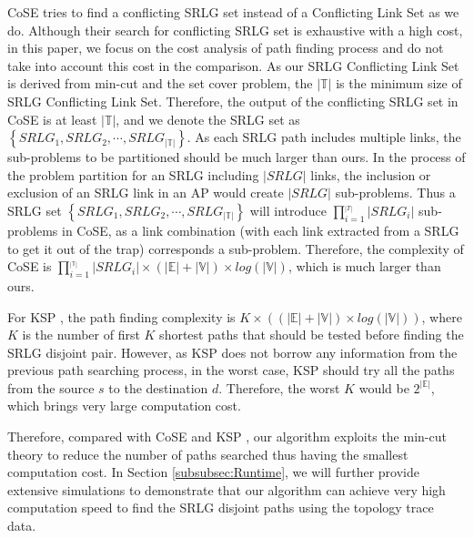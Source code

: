 CoSE tries to find a conflicting SRLG set instead of a Conflicting Link Set as we do. Although their search for conflicting SRLG set is exhaustive with a high cost, in this paper, we focus on the cost analysis of path finding process and do not take into account this cost in the comparison. As our SRLG Conflicting Link Set is derived from min-cut and the set cover problem, the $|\mathbb{T}|$ is the minimum size of SRLG Conflicting Link Set. Therefore, the output of the conflicting SRLG set in CoSE is at least $|\mathbb{T}|$, and we denote the SRLG set as $\left\{ {SRL{G_1},SRL{G_2}, \cdots ,SRL{G_{|\mathbb{T}|}}} \right\}$. As each SRLG path includes multiple links, the sub-problems to be partitioned should be much larger than ours. In the process of the problem partition for an SRLG including  $|SRLG|$ links, the inclusion or exclusion of an SRLG link in an AP would create  $|SRLG|$ sub-problems.  Thus a SRLG set $\left\{ {SRL{G_1},SRL{G_2}, \cdots ,SRL{G_{|\mathbb{T}|}}} \right\}$ will introduce $\prod\limits_{i = 1}^{_{\left| T \right|}} {\left| {SRL{G_i}} \right|}$ sub-problems in CoSE, as a link  combination (with each link extracted from a SRLG to get it out of the trap) corresponds  a sub-problem. Therefore, the complexity of CoSE  is $\prod\limits_{i = 1}^{_{|\mathbb{T}|}} {\left| {SRL{G_i}} \right|}\times (|\mathbb{E}|+|\mathbb{V}|)\times log(|\mathbb{V}|)$, which is much larger than ours.

For KSP \cite{eppstein1998finding}, the path finding complexity is $K\times ((|\mathbb{E}|+|\mathbb{V}|)\times log(|\mathbb{V}|))$, where $K$ is the number of first $K$ shortest paths that should be tested before finding the SRLG disjoint pair. However, as KSP does not borrow any information from the previous path searching process, in the worst case, KSP should try all the paths from the source $s$ to the destination $d$. Therefore, the worst $K$ would be  $2^{|\mathbb{E}|}$, which brings very large computation cost.

Therefore, compared with  CoSE \cite{rostami2007cose} and KSP \cite{eppstein1998finding}, our algorithm exploits the min-cut theory to reduce the number of paths searched thus having the smallest computation cost.  In Section \ref{subsubsec:Runtime}, we will further provide extensive simulations to demonstrate that our algorithm can achieve very high computation speed to find the SRLG disjoint paths using the topology trace data.
